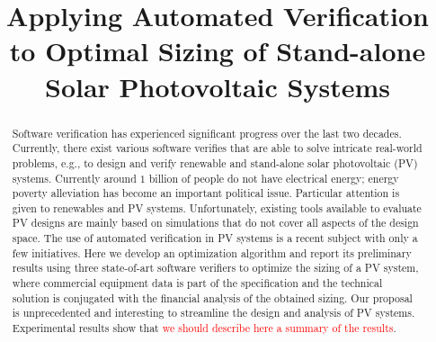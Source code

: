 \documentclass[10pt,conference]{IEEEtran}
\begin{document}
\title{Applying Automated Verification to Optimal Sizing of Stand-alone Solar Photovoltaic Systems\\
}

\author{
\and
{}
}

\maketitle

\begin{abstract}
Software verification has experienced significant progress over the last two decades. Currently, there exist various software verifies that are able to solve intricate real-world problems, e.g., to design and verify renewable and stand-alone solar photovoltaic (PV) systems. 
Currently around $1$ billion of people do not have electrical energy; energy poverty alleviation has become an important political issue. 
Particular attention is given to renewables and PV systems. Unfortunately, existing tools available to evaluate PV designs are mainly based on simulations that do not cover all aspects of the design space. 
The use of automated verification in PV systems is a recent subject with only a few initiatives. 
Here we develop an optimization algorithm and report its preliminary results using three state-of-art software verifiers to optimize the sizing of a PV system, where commercial equipment data is part of the specification and the technical solution is conjugated with the financial analysis of the obtained sizing. 
Our proposal is unprecedented and interesting to streamline the design and analysis of PV systems. Experimental results show that \textcolor{red}{we should describe here a summary of the results}.
\end{abstract}
\end{document}
